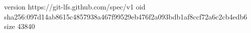version https://git-lfs.github.com/spec/v1
oid sha256:097d14ab8615c4857938a467f99529eb476f2a093bdb1af8ccf72a6c2cb4edb6
size 43840
